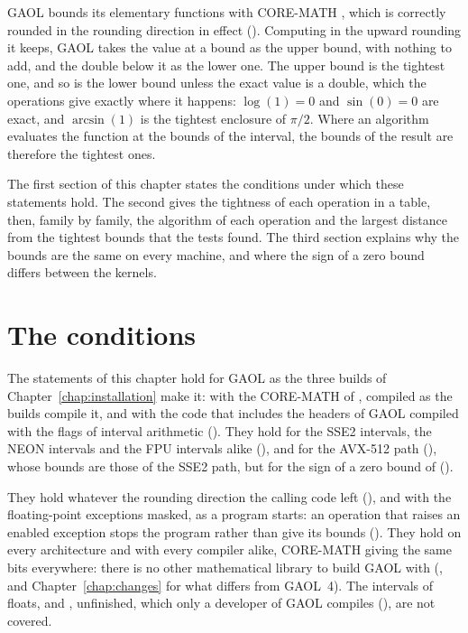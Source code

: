 \medskip
GAOL bounds its elementary functions with CORE-MATH \cite{CoreMath:2022},
which is correctly rounded in the rounding direction in effect
().
Computing in the upward rounding it keeps, GAOL takes the value at a bound
as the upper bound, with nothing to add, and the double below it as the
lower one. The upper bound is the tightest one, and so is the lower bound unless the exact
value is a double, which the operations give exactly where it happens:
$\log(1)=0$ and $\sin(0)=0$ are exact, and $\arcsin(1)$ is the tightest
enclosure of $\pi/2$. Where an algorithm evaluates the function at the
bounds of the interval, the bounds of the result are therefore the tightest
ones.

\medskip
The first section of this chapter states the conditions under which these
statements hold. The second gives the tightness of each operation in a
table, then, family by family, the algorithm of each operation and the
largest distance from the tightest bounds that the tests found. The third
section explains why the bounds are the same on every machine, and where
the sign of a zero bound differs between the kernels.

\section{The conditions}\label{sec:accuracy-conditions}
%

The statements of this chapter hold for GAOL as the three builds of
Chapter~\ref{chap:installation} make it: with the CORE-MATH of
, compiled as the builds compile it, and with the code
that includes the headers of GAOL compiled with the flags of interval
arithmetic (). They hold for the SSE2 intervals, the
NEON intervals\newinvfive{} and the FPU intervals alike
(), and for the AVX-512 path (), whose
bounds are those of the SSE2 path, but for the sign of a zero bound of
 ().

\medskip
They hold whatever the rounding direction the calling code left
(), and with the floating-point
exceptions masked, as a program starts: an operation that raises an enabled
exception stops the program rather than give its bounds
(). They hold on every architecture and with every
compiler alike, CORE-MATH giving the same bits everywhere: there is no other
mathematical library to build GAOL with (, and
Chapter~\ref{chap:changes} for what differs from GAOL~4). The intervals of
floats,  and , unfinished,
which only a developer of GAOL compiles (), are
not covered.

